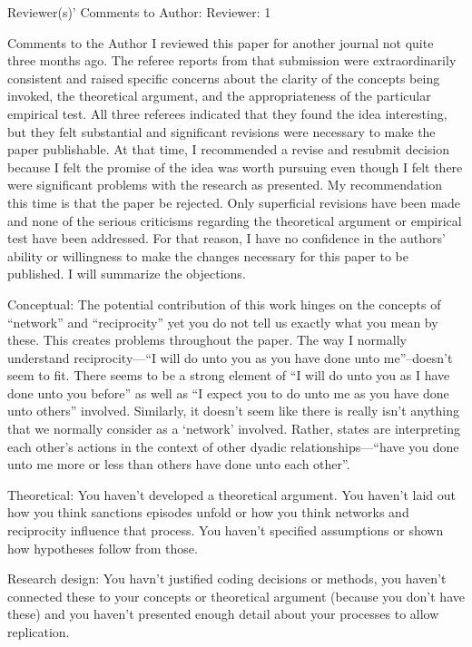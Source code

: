 Reviewer(s)' Comments to Author:
Reviewer: 1

Comments to the Author
I reviewed this paper for another journal not quite three months ago.  The referee reports from that submission were extraordinarily consistent and raised specific concerns about the clarity of the concepts being invoked, the theoretical argument, and the appropriateness of the particular empirical test.  All three referees indicated that they found the idea interesting, but they felt substantial and significant revisions were necessary to make the paper publishable.  At that time, I recommended a revise and resubmit decision because I felt the promise of the idea was worth pursuing even though I felt there were significant problems with the research as presented.  My recommendation this time is that the paper be rejected.  Only superficial revisions have been made and none of the serious criticisms regarding the theoretical argument or empirical test have been addressed.  For that reason, I have no confidence in the authors’ ability or willingness to make the changes necessary for this paper to be published.  I will summarize the objections.

Conceptual: The potential contribution of this work hinges on the concepts of “network” and “reciprocity” yet you do not tell us exactly what you mean by these.  This creates problems throughout the paper.  The way I normally understand reciprocity—“I will do unto you as you have done unto me”--doesn’t seem to fit.  There seems to be a strong element of “I will do unto you as I have done unto you before” as well as “I expect you to do unto me as you have done unto others” involved.  Similarly, it doesn’t seem like there is really isn’t anything that we normally consider as a ‘network’ involved.  Rather, states are interpreting each other’s actions in the context of other dyadic relationships—“have you done unto me more or less than others have done unto each other”.

Theoretical:  You haven’t developed a theoretical argument.  You haven’t laid out how you think sanctions episodes unfold or how you think networks and reciprocity influence that process.  You haven’t specified assumptions or shown how hypotheses follow from those.

Research design: You havn’t justified coding decisions or methods, you haven’t connected these to your concepts or theoretical argument (because you don’t have these) and you haven’t presented enough detail about your processes to allow replication.

